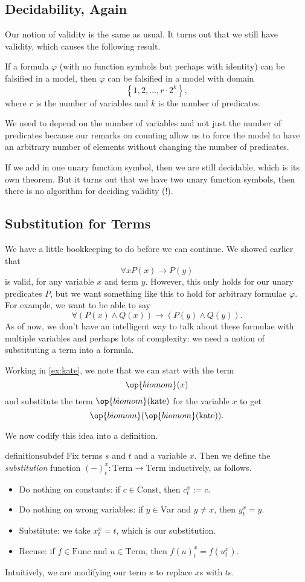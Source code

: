 \subsection{Decidability, Again}
Our notion of validity is the same as usual. It turns out that we still have validity, which causes the following result.
\begin{lemma}
	If a formula $\varphi$ (with no function symbols but perhaps with identity) can be falsified in a model, then $\varphi$ can be falsified in a model with domain
	\[\left\{1,2,\ldots,r\cdot 2^k\right\},\]
	where $r$ is the number of variables and $k$ is the number of predicates.
\end{lemma}
\begin{remark}
	We need to depend on the number of variables and not just the number of predicates because our remarks on counting allow us to force the model to have an arbitrary number of elements without changing the number of predicates.
\end{remark}
If we add in one unary function symbol, then we are still decidable, which is its own theorem. But it turns out that we have two unary function symbols, then there is no algorithm for deciding validity (!).

\subsection{Substitution for Terms}
We have a little bookkeeping to do before we can continue. We showed earlier that
\[\forall xP(x)\to P(y)\]
is valid, for any variable $x$ and term $y$. However, this only holds for our unary predicates $P$, but we want something like this to hold for arbitrary formulae $\varphi$. For example, we want to be able to say
\[\forall(P(x)\land Q(x))\to(P(y)\land Q(y)).\]
As of now, we don't have an intelligent way to talk about these formulae with multiple variables and perhaps lots of complexity: we need a notion of substituting a term into a formula.
\begin{example}
	Working in \autoref{ex:kate}, we note that we can start with the term
	\[\op{biomom}(x)\]
	and substitute the term $\op{biomom}(\mathrm{kate})$ for the variable $x$ to get
	\[\op{biomom}(\op{biomom}(\mathrm{kate})).\]
\end{example}
We now codify this idea into a definition.
\begin{restatable}{definition}{subdef}
	Fix terms $s$ and $t$ and a variable $x$. Then we define the \textit{substitution} function $(-)_t^x:\mathrm{Term}\to\mathrm{Term}$ inductively, as follows.
	\begin{itemize}
		\item Do nothing on constants: if $c\in\mathrm{Const}$, then $c^x_t:=c$.
		\item Do nothing on wrong variables: if $y\in\mathrm{Var}$ and $y\ne x$, then $y^x_t=y$.
		\item Substitute: we take $x^x_t=t$, which is our substitution.
		\item Recuse: if $f\in\mathrm{Func}$ and $u\in\mathrm{Term}$, then $f(u)_t^x=f(u_t^x)$.
	\end{itemize}
\end{restatable}
\noindent Intuitively, we are modifying our term $s$ to replace $x$s with $t$s.